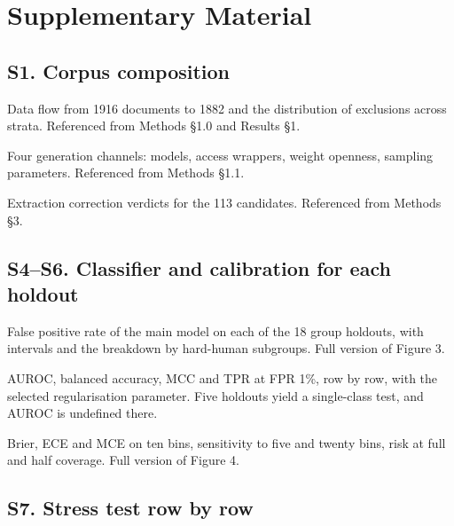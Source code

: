 \documentclass[11pt,a4paper]{article}
\renewcommand{\_}{\textunderscore\allowbreak}
\begin{document}
\clearpage
\renewcommand{\thetable}{S\arabic{table}}
\setcounter{table}{0}
\section{Supplementary Material}

\subsection{S1. Corpus composition}



Data flow from 1916 documents to 1882 and the distribution of exclusions across
strata. Referenced from Methods §1.0 and Results §1.



Four generation channels: models, access wrappers, weight openness, sampling
parameters. Referenced from Methods §1.1.



Extraction correction verdicts for the 113 candidates. Referenced from Methods §3.

\subsection{S4–S6. Classifier and calibration for each holdout}



False positive rate of the main model on each of the 18 group holdouts, with
intervals and the breakdown by hard-human subgroups. Full version of Figure 3.



AUROC, balanced accuracy, MCC and TPR at FPR 1\%, row by row, with the selected
regularisation parameter. Five holdouts yield a single-class test, and AUROC is
undefined there.



Brier, ECE and MCE on ten bins, sensitivity to five and twenty bins, risk at
full and half coverage. Full version of Figure 4.

\subsection{S7. Stress test row by row}


\end{document}
